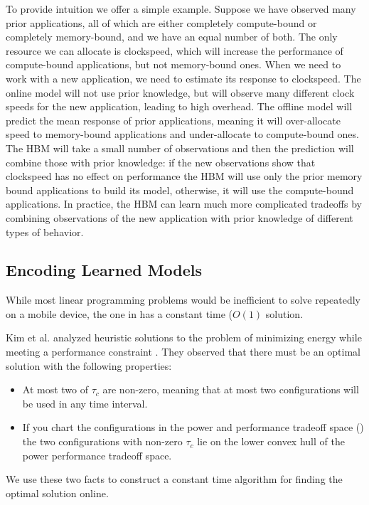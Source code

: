 To provide intuition we offer a simple example.  Suppose we have
observed many prior applications, all of which are either completely
compute-bound or completely memory-bound, and we have an equal number
of both.  The only resource we can allocate is clockspeed, which will
increase the performance of compute-bound applications, but not
memory-bound ones.  When we need to work with a new application, we
need to estimate its response to clockspeed.  The online model will
not use prior knowledge, but will observe many different clock speeds
for the new application, leading to high overhead.  The offline model
will predict the mean response of prior applications, meaning it will
over-allocate speed to memory-bound applications and under-allocate to
compute-bound ones.  The HBM will take a small number of observations
and then the prediction will combine those with prior knowledge: if
the new observations show that clockspeed has no effect on performance
the HBM will use only the prior memory bound applications to build its
model, otherwise, it will use the compute-bound applications.  In
practice, the HBM can learn much more complicated tradeoffs by
combining observations of the new application with prior knowledge of
different types of behavior.

\subsection{Encoding Learned Models}


  While most linear programming problems would be inefficient to solve
repeatedly on a mobile device, the one in  has a
constant time ($O(1)$ solution.

Kim et al. analyzed heuristic solutions to the problem of minimizing
energy while meeting a performance constraint \cite{kim-cpsna}.  They
observed that there must be an optimal solution with the following
properties:
\begin{itemize}
\item At most two of $\tau_c$ are non-zero, meaning that at most two
  configurations will be used in any time interval.
\item If you chart the configurations in the power and performance
  tradeoff space () the two configurations with
  non-zero $\tau_c$ lie on the lower convex hull of the power
  performance tradeoff space.
\end{itemize}
We use these two facts to construct a constant time algorithm for
finding the optimal solution online.


